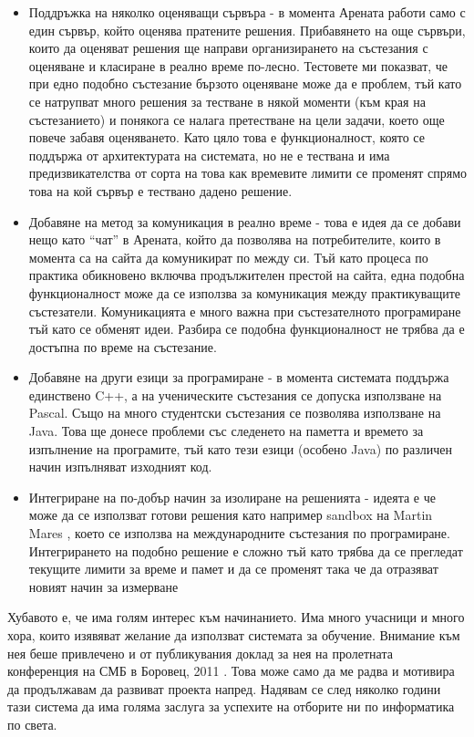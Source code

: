 \documentclass[a4paper,12pt]{article}
\begin{document}
    \begin{itemize}
      \item Поддръжка на няколко оценяващи сървъра - в момента Арената работи само с един сървър, който оценява пратените решения. Прибавянето на още сървъри, които да оценяват решения ще направи организирането на състезания с оценяване и класиране в реално време по-лесно. Тестовете ми показват, че при едно подобно състезание бързото оценяване може да е проблем, тъй като се натрупват много решения за тестване в някой моменти (към края на състезанието) и понякога се налага претестване на цели задачи, което още повече забавя оценяването. Като цяло това е функционалност, която се поддържа от архитектурата на системата, но не е тествана и има предизвикателства от сорта на това как времевите лимити се променят спрямо това на кой сървър е тествано дадено решение.
      \item Добавяне на метод за комуникация в реално време - това е идея да се добави нещо като ``чат'' в Арената, който да позволява на потребителите, които в момента са на сайта да комуникират по между си. Тъй като процеса по практика обикновено включва продължителен престой на сайта, една подобна функционалност може да се използва за комуникация между практикуващите състезатели. Комуникацията е много важна при състезателното програмиране тъй като се обменят идеи. Разбира се подобна функционалност не трябва да е достъпна по време на състезание.
      \item Добавяне на други езици за програмиране - в момента системата поддържа единствено C++, а на ученическите състезания се допуска използване на Pascal. Също на много студентски състезания се позволява използване на Java. Това ще донесе проблеми със следенето на паметта и времето за изпълнение на програмите, тъй като тези езици (особено Java) по различен начин изпълняват изходният код.
      \item Интегриране на по-добър начин за изолиране на решенията - идеята е че може да се използват готови решения като например sandbox на Martin Mares \cite{moe_sandbox}, което се използва на международните състезания по програмиране. Интегрирането на подобно решение е сложно тъй като трябва да се прегледат текущите лимити за време и памет и да се променят така че да отразяват новият начин за измерване
    \end{itemize}
    
    Хубавото е, че има голям интерес към начинанието. Има много учасници и много хора, които изявяват желание да използват системата за обучение. Внимание към нея беше привлечено и от публикувания доклад за нея на пролетната конференция на СМБ в Боровец, 2011 \cite{smb_doklad}. Това може само да ме радва и мотивира да продължавам да развиват проекта напред. Надявам се след няколко години тази система да има голяма заслуга за успехите на отборите ни по информатика по света.
  
\end{document}
